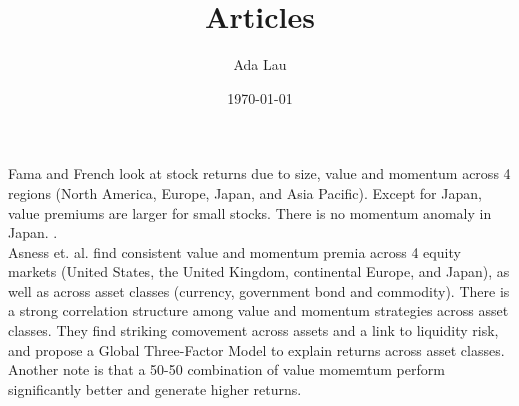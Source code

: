 \documentclass{article}
\begin{document}
\title{Articles}
\author{Ada Lau}
\date{\today}
\maketitle

Fama and French look at stock returns due to size, value and momentum across 4 regions (North America, Europe, Japan, and Asia Pacific). Except for Japan, value
premiums are larger for small stocks. There is no momentum anomaly in Japan. \cite{ff2012svm}. \\

Asness et. al. find consistent value and momentum premia across 4 equity markets (United States, the United Kingdom, continental Europe, and Japan), as well as across asset classes (currency, government bond and commodity). There is a strong correlation structure among value and momentum strategies across asset classes.
They find striking comovement across assets and a link to liquidity risk, and propose a Global Three-Factor Model to explain returns across asset classes. Another note is that a 50-50 combination of value momemtum perform significantly better and generate higher returns. \cite{asness2013vm}

\printbibliography
\end{document}
